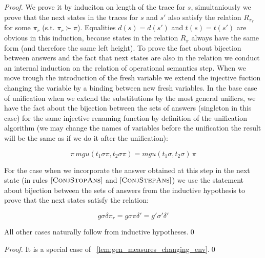 \begin{proof}
We prove it by induciton on length of the trace for $s$, simultaniously we prove that the next states in the traces for $s$ and $s'$ also satisfy the relation $R_{\pi_r}$ for some $\pi_r$ (s.t. $\pi_r \succ \pi$). Equalities $d(s) = d(s')$ and $t(s) = t(s')$ are obvious in this induction, because states in the relation $R_{\pi}$ always have the same form (and therefore the same left height). To prove the fact about bijection between answers and the fact that next states are also in the relation we conduct an internal induction on the relation of operational semantics step. When we move trough the introduction of the fresh variable we extend the injective fuction changing the variable by a binding between new fresh variables. In the base case of unification when we extend the substitutions by the most general unifiers, we have the fact about the bijection between the sets of answers (singleton in this case) for the same injective renaming function by definition of the unification algorithm (we may change the names of variables before the unification the result will be the same as if we do it after the unification):

\[ \pi \, mgu(t_1 \sigma \pi, t_2 \sigma \pi) = mgu(t_1 \sigma, t_2 \sigma) \, \pi  \]

For the case when we incorporate the answer obtained at this step in the next state (in rules $\mbox{[\textsc{ConjStopAns}]} $ and $\mbox{[\textsc{ConjStepAns}]}$) we use the statement about bijection between the sets of answers from the inductive hypothesis to prove that the next states satisfy the relation:

\[ g \sigma \delta \pi_r = g \sigma \pi \delta' = g' \sigma' \delta'  \] 

All other cases naturally follow from inductive hypotheses.\qed

\end{proof}

\begin{proof}
It is a special case of \lemmaword~\ref{lem:gen_measures_changing_env}.\qed
\end{proof}

